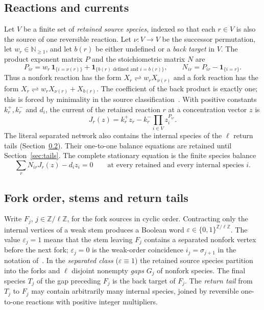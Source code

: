 \documentclass[11pt,reqno]{amsart}
\theoremstyle{plain}
\theoremstyle{definition}
\theoremstyle{remark}
\numberwithin{equation}{section}
\newcommand{\N}{\mathbb{N}}
\newcommand{\Z}{\mathbb{Z}}
\newcommand{\one}{\mathbf{1}}
\begin{document}
\subsection{Reactions and currents}\label{subsec:reactions}
Let $V$ be a finite set of \emph{retained source species}, indexed so that each $r\in V$ is also the source of one reversible reaction.  Let $\nu\colon V\to V$ be the successor permutation, let $w_r\in\N_{\ge1}$, and let $b(r)$ be either undefined or a \emph{back target} in $V$.  The product exponent matrix $P$ and the stoichiometric matrix $N$ are
\begin{equation}\label{eq:PN}
P_{ir}=w_r\,\one_{\{i=\nu(r)\}}+\one_{\{b(r)\text{ defined and }i=b(r)\}},\qquad
N_{ir}=P_{ir}-\one_{\{i=r\}} .
\end{equation}
Thus a nonfork reaction has the form $X_r\rightleftharpoons w_rX_{\nu(r)}$ and a fork reaction has the form $X_r\rightleftharpoons w_rX_{\nu(r)}+X_{b(r)}$.  The coefficient of the back product is exactly one; this is forced by minimality in the source classification~\cite[\S 1.2]{NNU26}.  With positive constants $k_r^+,k_r^-$ and $d_i$, the current of the retained reaction $r$ at a concentration vector $z$ is
\begin{equation}\label{eq:current}
J_r(z)=k_r^+z_r-k_r^-\prod_{i\in V}z_i^{P_{ir}} .
\end{equation}
The literal separated network also contains the internal species of the $\ell$ return tails (Section~\ref{subsec:forks}).  Their one-to-one balance equations are retained until Section~\ref{sec:tails}.  The complete stationary equation is the finite species balance
\begin{equation}\label{eq:stationary}
\sum_{r}N_{ir}J_r(z)-d_iz_i=0\qquad\text{at every retained and every internal species }i .
\end{equation}

\subsection{Fork order, stems and return tails}\label{subsec:forks}
Write $F_j$, $j\in\Z/\ell\Z$, for the fork sources in cyclic order.  Contracting only the internal vertices of a weak stem produces a Boolean word $\varepsilon\in\{0,1\}^{\Z/\ell\Z}$.  The value $\varepsilon_j=1$ means that the stem leaving $F_j$ contains a separated nonfork vertex before the next fork; $\varepsilon_j=0$ is the weak-order coincidence $i_j=\sigma_{j+1}$ in the notation of~\cite{NNU26}.  In the \emph{separated class} ($\varepsilon\equiv1$) the retained source species partition into the forks and $\ell$ disjoint nonempty \emph{gaps} $G_j$ of nonfork species.  The final species $T_j$ of the gap preceding $F_j$ is the back target of $F_j$.  The \emph{return tail} from $T_j$ to $F_j$ may contain arbitrarily many internal species, joined by reversible one-to-one reactions with positive integer multipliers.
\end{document}
